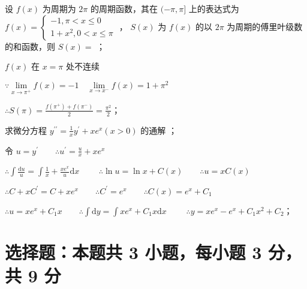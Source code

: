 \begin{question}[points = 3]
    设 $f(x)$ 为周期为 $2\pi$ 的周期函数，其在 $(-\pi, \pi]$ 上的表达式为
    $f(x) = \begin{cases}
            -1, \pi < x \leq 0 \\
            1 + x^2, 0 < x \leq \pi
        \end{cases}$ ， $S(x)$ 为 $f(x)$ 的以 $2\pi$ 为周期的傅里叶级数的和函数，则 $S(x) = $ \fillin[$\frac{\pi^2}{2}$]；
\end{question}
\begin{solution}
    $f(x)$ 在 $x = \pi$ 处不连续

    $\because \lim\limits_{x \to \pi^+} f(x) = -1 \quad \lim\limits_{x \to x^-} f(x) = 1 + \pi^2$

    $\therefore S(\pi) = \frac{f(\pi^+) + f(\pi^-)}{2} = \frac{\pi^2}{2}$；
\end{solution}

\begin{question}[points = 3]
    求微分方程 $y^{\prime\prime} = \frac{1}{x}y^{\prime} + xe^x(x > 0)$ 的通解 \fillin[$y = xe^x - e^x + C_1x^2 + C_2$]；
\end{question}
\begin{solution}
    令 $u = y^{\prime} \qquad \therefore u^{\prime} = \frac{u}{x} + xe^x$

    $\therefore \int \frac{\mathrm{d}u}{u} = \int \frac{1}{x} + \frac{xe^x}{u}\mathrm{d}x \qquad$
    $\therefore \ln{u} = \ln{x} + C(x) \qquad \therefore u = xC(x)$

    $\therefore C + xC^{\prime} = C + xe^x \qquad \therefore C^{\prime} = e^x \qquad \therefore C(x) = e^x + C_1$

    $\therefore u = xe^x + C_1x \qquad \therefore \int \mathrm{d}y = \int xe^x + C_1x \mathrm{d}x \qquad$
    $\therefore y = xe^x - e^x + C_1x^2 + C_2$；
\end{solution}

\section{选择题：本题共 3 小题，每小题 3 分，共 9 分}

